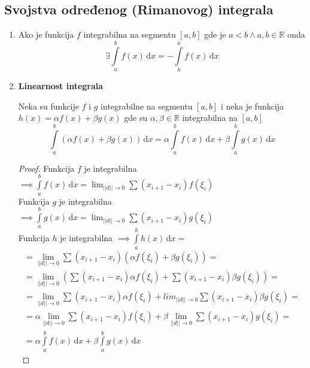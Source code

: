 \subsection{Svojstva određenog (Rimanovog) integrala}
\begin{enumerate}[label=\textbf{\arabic*.)}]
	\item
		\begin{theorem}
			Ako je funkcija $f$ integrabilna na segmentu $[a,b]$ gde je $a<b \land a,b \in \mathbb{R}$ onda $$\exists \int \limits^b_a f(x) \, \mathrm{d}x = - \int \limits^a_b f(x) \, \mathrm{d}x$$
		\end{theorem}
	\item 
		\textbf{Linearnost integrala}
		
		\begin{theorem}
				Neka su funkcije $f$ i $g$ integrabilne na segmentu $[a,b]$ i neka je funkcija $h(x) = \alpha f(x)+ \beta g(x)$ gde su $\alpha, \beta \in \mathbb{R}$ integrabilna na $[a,b]$
				$$\int\limits^b_a \left(\alpha f(x) + \beta g(x)\right) \, \mathrm{d} x = \alpha \int \limits^b_a f(x)\, \mathrm{d} x + \beta \int \limits^b_a g(x) \, \mathrm{d} x$$
		\end{theorem}
		\begin{proof}
			Funkcija $f$ je integrabilna $\implies \int \limits^b_a f(x) \, \mathrm{d}x = \lim_{||d|| \to 0} \sum (x_{i+1}-x_i)f(\xi_i)$\\
			Funkcija $g$ je integrabilna $\implies \int \limits^b_a g(x) \, \mathrm{d}x = \lim_{||d|| \to 0} \sum (x_{i+1}-x_i)g(\xi_i)$\\
			Funkcija $h$ je integrabilna $\implies \int \limits^b_a h(x) \, \mathrm{d}x =$\\
			\begin{gather*}
				=\lim_{||d|| \to 0} \sum (x_{i+1}-x_i)(\alpha f(\xi_i) + \beta g(\xi_i)) =\\
				= \lim_{||d|| \to 0} \left(\sum (x_{i+1}-x_i)\alpha f(\xi_i) + \sum (x_{i+1}-x_i)\beta g(\xi_i)\right) =\\
				= \lim_{||d|| \to 0} \sum (x_{i+1}-x_i)\alpha f(\xi_i) + lim_{||d|| \to 0}\sum (x_{i+1}-x_i)\beta g(\xi_i) =\\
				= \alpha\lim_{||d|| \to 0} \sum (x_{i+1}-x_i) f(\xi_i) + \beta \lim_{||d|| \to 0}\sum (x_{i+1}-x_i) g(\xi_i) =\\
				= \alpha \int \limits^b_a f(x) \, \mathrm{d}x + \beta \int 	\limits^b_a g(x) \, \mathrm{d}x
			\end{gather*}
		\end{proof}

\end{enumerate}
